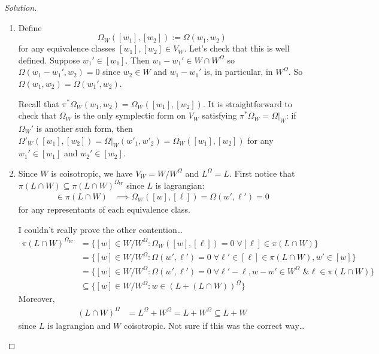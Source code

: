 \begin{proof}[Solution]\leavevmode 
	\begin{enumerate}[label=\alph*.]
		\item Define
			\[\Omega_{W}([w_1],[w_2]):=\Omega(w_1,w_2)\]
			for any equivalence classes $[w_1],[w_2]\in V_{W}$. Let's check that this is well defined. Suppose $w_1'\in [w_1]$. Then $w_1-w_1'\in W\cap W^{\Omega}$ so $\Omega(w_1-w_1',w_2)=0$ since $w_2\in W$ and $w_1-w_1'$ is, in particular, in $W^{\Omega}$. So $\Omega(w_1,w_2)=\Omega(w_1',w_2)$.

			Recall that $\pi^{*} \Omega_{W}(w_1,w_2)=\Omega_{W}([w_1],[w_2])$. It is straightforward to check that $\Omega_{W}$ is the only symplectic form on $V_{W}$ satisfying $\pi^{*} \Omega_{W}=\Omega|_{W}$: if $\Omega_{W}'$ is another such form, then $\Omega'_{W}([w_1],[w_2])=\Omega|_{W}(w'_1,w'_2)=\Omega_{W}([w_1],[w_2])$ for any $w_1'\in [w_1]$ and $w_2'\in [w_2]$.

\item Since $W$ is coisotropic, we have $V_W=W/W^\Omega$ and $L^\Omega=L$. First notice that $\pi(L\cap W)\subseteq\pi(L\cap W)^{\Omega_W}$ since $L$ is lagrangian:
				\begin{align*}
					[w]\in\pi(L\cap W)&\implies \Omega_W([w],[\ell])=\Omega(w',\ell')=0				\end{align*}
for any representants of each equivalence class.

				I couldn't really prove the other contention…
				\begin{align*}
					\pi(L\cap W)^{\Omega_W} & =\{[w]\in W/W^\Omega:\Omega_W([w],[\ell])=0\;\forall [\ell]\in \pi(L\cap W)\} \\
					& =\{[w]\in W/W^\Omega:\Omega(w',\ell'
					)=0\;\forall \ell'\in[\ell]\in\pi(L\cap W), w'\in [w]\} \\
						& =\{[w]\in W/W^\Omega:\Omega(w',\ell'
						)=0\; \forall \ell'-\ell,w-w'\in W^\Omega\text{ \& } \ell\in\pi(L\cap W)\}\\
						&\subseteq\{[w]\in W/W^\Omega:w\in(L+(L\cap W))^\Omega\}
				\end{align*}
				Moreover,
				\begin{align*}
					(L\cap W)^\Omega & =L^\Omega+ W^\Omega =L+ W^\Omega\subseteq L + W
				\end{align*}
				since $L$ is lagrangian and $W$ coisotropic. Not sure if this was the correct way…
\end{enumerate}
\end{proof}

